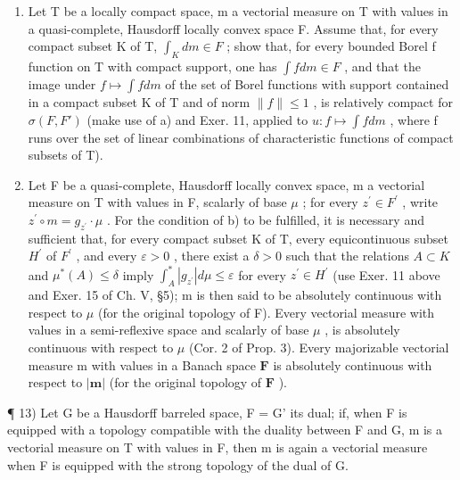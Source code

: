 \begin{enumerate}
\def\labelenumi{\alph{enumi})}
\setcounter{enumi}{1}
\item
  Let T be a locally compact space, m a vectorial measure on T with values in a quasi-complete, Hausdorff locally convex space F. Assume that, for every compact subset K of T, \(\int_{K} dm \in F\) ; show that, for every bounded Borel f function on T with compact support, one has \(\int f dm \in F\) , and that the image under \(f \mapsto \int f dm\) of the set of Borel functions with support contained in a compact subset K of T and of norm \(\|f\| \leqslant 1\) , is relatively compact for \(\sigma(F, F')\) (make use of a) and Exer. 11, applied to \(u : f \mapsto \int f dm\) , where f runs over the set of linear combinations of characteristic functions of compact subsets of T).
\item
  Let F be a quasi-complete, Hausdorff locally convex space, m a vectorial measure on T with values in F, scalarly of base \(\mu\) ; for every \(z^{\prime} \in F^{\prime}\) , write \(z^{\prime} \circ m = g_{z^{\prime}} \cdot \mu\) . For the condition of b) to be fulfilled, it is necessary and sufficient that, for every compact subset K of T, every equicontinuous subset \(H^{\prime}\) of \(F^{\prime}\) , and every \(\varepsilon > 0\) , there exist a \(\delta > 0\) such that the relations \(A \subset K\) and \(\mu^{*}(A) \leqslant \delta\) imply \(\int_{A}^{*}|g_{z^{\prime}}| d\mu \leqslant \varepsilon\) for every \(z^{\prime} \in H^{\prime}\) (use Exer. 11 above and Exer. 15 of Ch. V, §5); m is then said to be absolutely continuous with respect to \(\mu\) (for the original topology of F). Every vectorial measure with values in a semi-reflexive space and scalarly of base \(\mu\) , is absolutely continuous with respect to \(\mu\) (Cor. 2 of Prop. 3). Every majorizable vectorial measure m with values in a Banach space \(\mathbf{F}\) is absolutely continuous with respect to \(|\mathbf{m}|\) (for the original topology of \(\mathbf{F}\) ).
\end{enumerate}

¶ 13) Let G be a Hausdorff barreled space, F = G' its dual; if, when F is equipped with a topology compatible with the duality between F and G, m is a vectorial measure on T with values in F, then m is again a vectorial measure when F is equipped with the strong topology of the dual of G.

